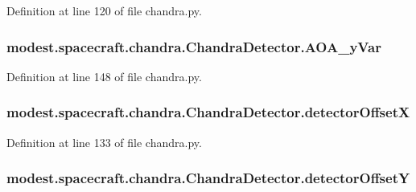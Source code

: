 Definition at line 120 of file chandra.\+py.

\subsubsection[{\texorpdfstring{A\+O\+A\+\_\+y\+Var}{AOA_yVar}}]{\setlength{\rightskip}{0pt plus 5cm}modest.\+spacecraft.\+chandra.\+Chandra\+Detector.\+A\+O\+A\+\_\+y\+Var}\hypertarget{classmodest_1_1spacecraft_1_1chandra_1_1ChandraDetector_af2aec3d08e18e08ad751f76f34bd1807}{}\label{classmodest_1_1spacecraft_1_1chandra_1_1ChandraDetector_af2aec3d08e18e08ad751f76f34bd1807}


Definition at line 148 of file chandra.\+py.

\subsubsection[{\texorpdfstring{detector\+OffsetX}{detectorOffsetX}}]{\setlength{\rightskip}{0pt plus 5cm}modest.\+spacecraft.\+chandra.\+Chandra\+Detector.\+detector\+OffsetX}\hypertarget{classmodest_1_1spacecraft_1_1chandra_1_1ChandraDetector_ab9dd653c27aabc7b15feb31b6b939218}{}\label{classmodest_1_1spacecraft_1_1chandra_1_1ChandraDetector_ab9dd653c27aabc7b15feb31b6b939218}


Definition at line 133 of file chandra.\+py.

\subsubsection[{\texorpdfstring{detector\+OffsetY}{detectorOffsetY}}]{\setlength{\rightskip}{0pt plus 5cm}modest.\+spacecraft.\+chandra.\+Chandra\+Detector.\+detector\+OffsetY}\hypertarget{classmodest_1_1spacecraft_1_1chandra_1_1ChandraDetector_a0ba3efc9bbb500a4e061f1e59d7d9cae}{}\label{classmodest_1_1spacecraft_1_1chandra_1_1ChandraDetector_a0ba3efc9bbb500a4e061f1e59d7d9cae}


